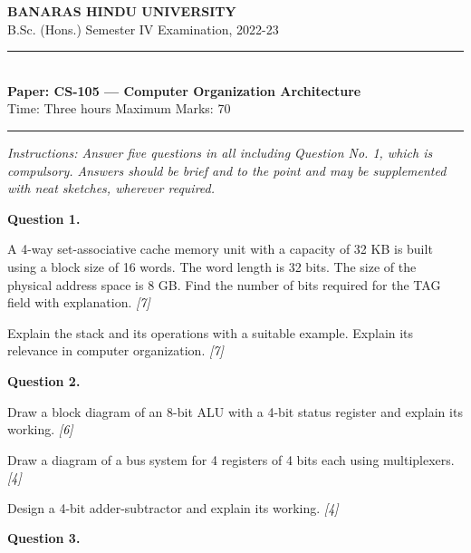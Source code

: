 \documentclass[11pt,a4paper]{article}
\newcommand{\pts}[1]{\hfill   \textit{[#1]}}
\begin{document}
\begin{center}
  {\large\bfseries BANARAS HINDU UNIVERSITY}\\[2pt]
  {\normalsize B.Sc. (Hons.) Semester IV Examination, 2022-23}\\[6pt]
  \rule{0.8\linewidth}{0.5pt}\\[6pt]
  {\large\bfseries Paper: CS-105 --- Computer Organization Architecture}\\[4pt]
  {\normalsize Time: Three hours \hfill Maximum Marks: 70}
\end{center}

\rule{\linewidth}{0.4pt}

\smallskip



\noindent   \textit{Instructions: Answer five questions in all including Question No. 1, which is compulsory. Answers should be brief and to the point and may be supplemented with neat sketches, wherever required.}

\bigskip

\medskip


\noindent   \textbf{Question 1.}

\begin{parts}
  \item A 4-way set-associative cache memory unit with a capacity of 32 KB is built using a block size of 16 words. The word length is 32 bits. The size of the physical address space is 8 GB. Find the number of bits required for the TAG field with explanation. \pts{7}
  \item Explain the stack and its operations with a suitable example. Explain its relevance in computer organization. \pts{7}
\end{parts}

\medskip


\noindent   \textbf{Question 2.}

\begin{parts}
  \item Draw a block diagram of an 8-bit ALU with a 4-bit status register and explain its working. \pts{6}
  \item Draw a diagram of a bus system for 4 registers of 4 bits each using multiplexers. \pts{4}
  \item Design a 4-bit adder-subtractor and explain its working. \pts{4}
\end{parts}

\medskip


\noindent   \textbf{Question 3.}
\end{document}
